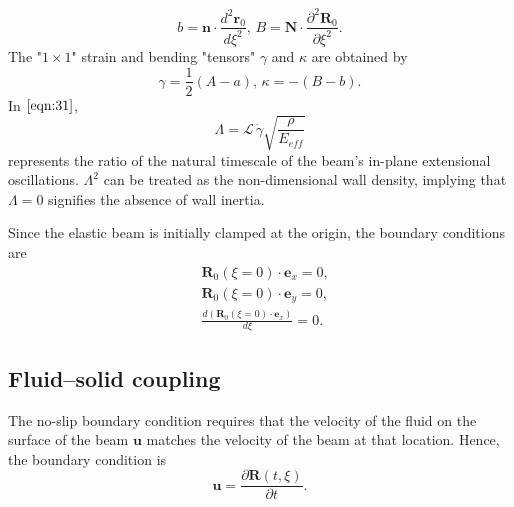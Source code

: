 \documentclass[a4paper,12pt]{article}
\begin{document}
\begin{equation}
	\label{eqn:34}
	b=\textbf{n}\cdot\frac{d^2\textbf{r}_0}{d\xi^2},\,B=\textbf{N}\cdot\frac{\partial^2\textbf{R}_0}{\partial\xi^2}.
\end{equation}
The "$1\times1$" strain and bending "tensors" $\gamma$ and $\kappa$ are obtained by
\begin{equation}
	\label{eqn:35}
	\gamma=\frac{1}{2}(A-a),\,\kappa=-(B-b).
\end{equation}
In $\eqref{eqn:31}$,
\begin{equation}
	\label{eqn:36}
	\Lambda=\mathcal{L}\,\dot{\gamma}\sqrt{\frac{\rho}{E_{eff}}}
\end{equation}
represents the ratio of the natural timescale of the beam's in-plane extensional oscillations. 
$\Lambda^2$ can be treated as the non-dimensional wall density, implying that $\Lambda=0$ signifies the absence of wall inertia.

Since the elastic beam is initially clamped at the origin, the boundary conditions are
\begin{equation}
	\label{eqn:58}
	\begin{aligned}
	&\mathbf{R}_0(\xi=0)\cdot\mathbf{e}_x=0,\\
	&\mathbf{R}_0(\xi=0)\cdot\mathbf{e}_y=0,\\
	&\frac{d\left(\mathbf{R}_0(\xi=0)\cdot\mathbf{e}_x\right)}{d\xi}=0.
	\end{aligned}
\end{equation}

\subsection{Fluid–solid coupling}
The no-slip boundary condition requires that the velocity of the fluid on the surface of the beam $\mathbf{u}$ matches the velocity of the beam at that location. Hence, the boundary condition is 
\begin{equation}
	\label{eqn:100}
	\mathbf{u}=\frac{\partial \mathbf{R}(t,\xi)}{\partial t}.
\end{equation}
\end{document}
